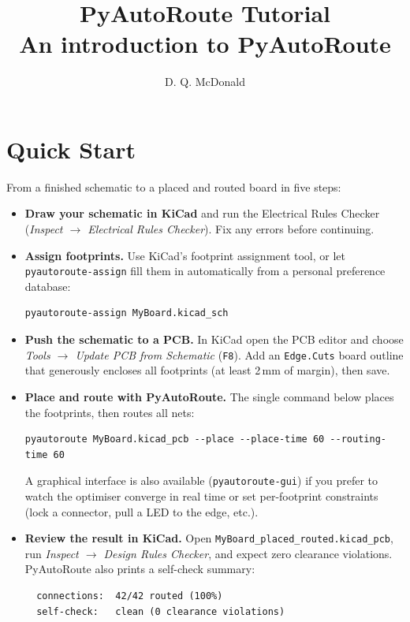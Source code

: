 \documentclass[11pt,a4paper]{article}
\title{\textbf{PyAutoRoute Tutorial}\\[0.4em]
       \large An introduction to PyAutoRoute}
\author{D. Q. McDonald}
\date{}
\begin{document}
\maketitle

\begin{center}
\end{center}

\tableofcontents
\newpage

\section{Quick Start}

From a finished schematic to a placed and routed board in five steps:

\begin{itemize}
    \item \textbf{Draw your schematic in KiCad} and run the
          Electrical Rules Checker (\emph{Inspect $\to$ Electrical Rules Checker}).
          Fix any errors before continuing.

    \item \textbf{Assign footprints.} Use KiCad's footprint assignment tool,
          or let \texttt{pyautoroute-assign} fill them in automatically from a
          personal preference database:
\begin{lstlisting}
pyautoroute-assign MyBoard.kicad_sch
\end{lstlisting}

    \item \textbf{Push the schematic to a PCB.} In KiCad open the PCB editor
          and choose \emph{Tools $\to$ Update PCB from Schematic} (\texttt{F8}).
          Add an \texttt{Edge.Cuts} board outline that generously encloses all
          footprints (at least 2\,mm of margin), then save.

    \item \textbf{Place and route with PyAutoRoute.}
          The single command below places the footprints, then routes all nets:
\begin{lstlisting}
pyautoroute MyBoard.kicad_pcb --place --place-time 60 --routing-time 60
\end{lstlisting}
          A graphical interface is also available (\texttt{pyautoroute-gui})
          if you prefer to watch the optimiser converge in real time or set
          per-footprint constraints (lock a connector, pull a LED to the edge, etc.).

    \item \textbf{Review the result in KiCad.} Open
          \texttt{MyBoard\_placed\_routed.kicad\_pcb}, run
          \emph{Inspect $\to$ Design Rules Checker}, and expect zero
          clearance violations. PyAutoRoute also prints a self-check summary:
\begin{lstlisting}
  connections:  42/42 routed (100%)
  self-check:   clean (0 clearance violations)
\end{lstlisting}
\end{itemize}
\end{document}
